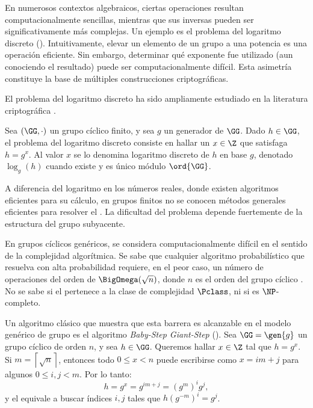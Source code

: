 
En numerosos contextos algebraicos, ciertas operaciones resultan computacionalmente sencillas, mientras que sus inversas pueden ser significativamente más complejas. Un ejemplo es el problema del logaritmo discreto (\DLP). Intuitivamente, elevar un elemento de un grupo a una potencia es una operación eficiente. Sin embargo, determinar qué exponente fue utilizado (aun conociendo el resultado) puede ser computacionalmente difícil. Esta asimetría constituye la base de múltiples construcciones criptográficas.

El problema del logaritmo discreto ha sido ampliamente estudiado en la literatura criptográfica \cite{hac,katz}.

\begin{definition}[\DLP]
	Sea $(\GG, \cdot)$ un grupo cíclico finito, y sea $g$ un generador de $\GG$. Dado $h \in \GG$, el problema del logaritmo discreto consiste en hallar un $x \in \Z$ que satisfaga $h = g^x$. Al valor $x$ se lo denomina logaritmo discreto de $h$ en base $g$, denotado $\log_g(h)$ cuando existe y es único módulo $\ord{\GG}$.
\end{definition}

A diferencia del logaritmo en los números reales, donde existen algoritmos eficientes para su cálculo, en grupos finitos no se conocen métodos generales eficientes para resolver el \DLP. La dificultad del problema depende fuertemente de la estructura del grupo subyacente.

En grupos cíclicos genéricos, \DLP se considera computacionalmente difícil en el sentido de la complejidad algorítmica. Se sabe que cualquier algoritmo probabilístico que resuelva \DLP con alta probabilidad requiere, en el peor caso, un número de operaciones del orden de $\BigOmega(\sqrt{n})$, donde $n$ es el orden del grupo cíclico \cite{shoup1997lowerbounds}. No se sabe si el \DLP pertenece a la clase de complejidad $\Pclass$, ni si es $\NP$-completo.

Un algoritmo clásico que muestra que esta barrera es alcanzable en el modelo genérico de grupo es el algoritmo \textit{Baby-Step Giant-Step} (\BSGS). Sea $\GG = \gen{g}$ un grupo cíclico de orden $n$, y sea $h \in \GG$. Queremos hallar $x \in \Z$ tal que $h = g^x$. Si $m = \left\lceil \sqrt{n} \right\rceil$, entonces todo $0 \leq x < n$ puede escribirse como $x = im + j$ para algunos $0 \leq i,j < m$. Por lo tanto:
$$h = g^x = g^{im + j} = (g^m)^i g^j,$$
y el \DLP equivale a buscar índices $i,j$ tales que $h(g^{-m})^i = g^j$.

